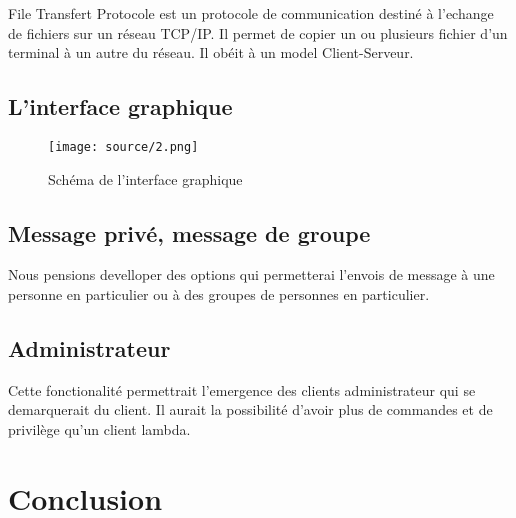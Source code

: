 \documentclass[a4paper 14pt]{article}
\begin{document}
File Transfert Protocole est un protocole de communication destiné à l'echange de fichiers sur un réseau TCP/IP.
Il permet de copier un ou plusieurs fichier d'un terminal à un autre du réseau.
Il obéit à un model  Client-Serveur. 

\subsection{L'interface graphique}

\begin{figure}[h]
   \texttt{[image: source/2.png]}
	\caption{Schéma de l'interface graphique}
\end{figure}

\newpage
\subsection{Message privé, message de groupe}

Nous pensions develloper des options qui permetterai l'envois de message à une personne en particulier ou à des groupes de personnes en particulier.

\subsection{Administrateur}

Cette fonctionalité permettrait l'emergence des clients administrateur qui se demarquerait du client.
Il aurait la possibilité d'avoir plus de commandes et de privilège qu'un client lambda.


\section{Conclusion}
\end{document}
